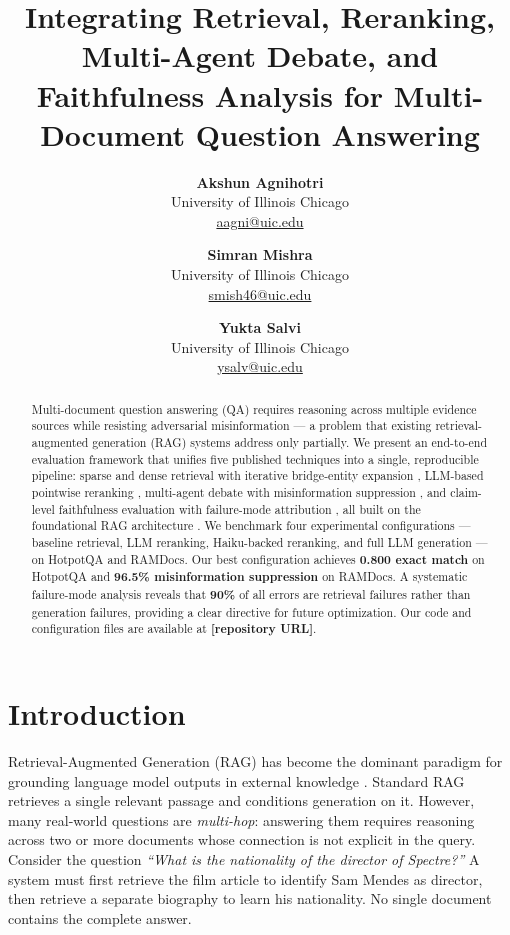 \documentclass{article}
\title{Integrating Retrieval, Reranking, Multi-Agent Debate, and \\
       Faithfulness Analysis for Multi-Document Question Answering}
\author{%
  \textbf{Akshun Agnihotri} \\
  University of Illinois Chicago \\
  \url{aagni@uic.edu}
  \and
  \textbf{Simran Mishra} \\
  University of Illinois Chicago \\
  \url{smish46@uic.edu}
  \and
  \textbf{Yukta Salvi} \\
  University of Illinois Chicago \\
  \url{ysalv@uic.edu}
}
\newcommand{\placeholder}[1]{\textbf{[#1]}}
\begin{document}
\maketitle

\begin{abstract}
Multi-document question answering (QA) requires reasoning across
multiple evidence sources while resisting adversarial misinformation —
a problem that existing retrieval-augmented generation (RAG) systems
address only partially.  We present an end-to-end evaluation framework
that unifies five published techniques into a single, reproducible
pipeline: sparse and dense retrieval with iterative bridge-entity
expansion \citep{asai2023selfrag}, LLM-based pointwise reranking
\citep{yu2024rankrag}, multi-agent debate with misinformation
suppression \citep{yoran2024madam}, and claim-level faithfulness
evaluation with failure-mode attribution \citep{ru2024ragchecker},
all built on the foundational RAG architecture \citep{lewis2020rag}.
We benchmark four experimental configurations — baseline retrieval,
LLM reranking, Haiku-backed reranking, and full LLM generation — on
HotpotQA \citep{yang2018hotpotqa} and RAMDocs.  Our best
configuration achieves \textbf{0.800 exact match} on HotpotQA and
\textbf{96.5\% misinformation suppression} on RAMDocs.  A systematic
failure-mode analysis reveals that \textbf{90\%} of all errors are
retrieval failures rather than generation failures, providing a clear
directive for future optimization.  Our code and configuration files
are available at \placeholder{repository URL}.
\end{abstract}

\section{Introduction}
\label{sec:intro}

Retrieval-Augmented Generation (RAG) has become the dominant
paradigm for grounding language model outputs in external knowledge
\citep{lewis2020rag}.  Standard RAG retrieves a single relevant
passage and conditions generation on it.  However, many real-world
questions are \emph{multi-hop}: answering them requires reasoning
across two or more documents whose connection is not explicit in the
query.  Consider the question \emph{``What is the nationality of the
director of Spectre?''}  A system must first retrieve the film
article to identify Sam Mendes as director, then retrieve a separate
biography to learn his nationality.  No single document contains the
complete answer.
\end{document}
